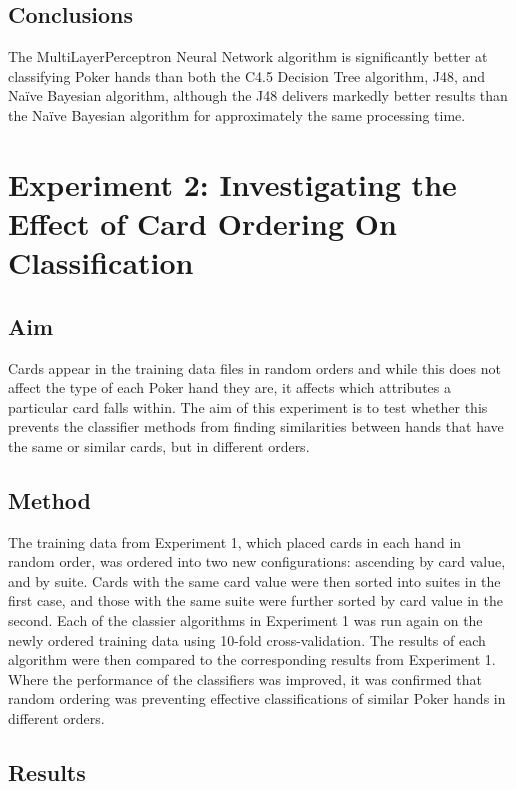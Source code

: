 \documentclass[10pt, a4paper]{article}
\begin{document}
\subsection*{Conclusions}

The MultiLayerPerceptron Neural Network algorithm is significantly better at classifying Poker hands than both the C4.5 Decision Tree algorithm, J48, and Na\"ive Bayesian algorithm, although the J48 delivers markedly better results than the Na\"ive Bayesian algorithm for approximately the same processing time.


\section*{Experiment 2: Investigating the Effect of Card Ordering On Classification}

\subsection*{Aim}

Cards appear in the training data files in random orders and while this does not affect the type of each Poker hand they are, it affects which attributes a particular card falls within. The aim of this experiment is to test whether this prevents the classifier methods from finding similarities between hands that have the same or similar cards, but in different orders.

\subsection*{Method}

The training data from Experiment 1, which placed cards in each hand in random order, was ordered into two new configurations: ascending by card value, and by suite. Cards with the same card value were then sorted into suites in the first case, and those with the same suite were further sorted by card value in the second. Each of the classier algorithms in Experiment 1 was run again on the newly ordered training data using 10-fold cross-validation. The results of each algorithm were then compared to the corresponding results from Experiment 1. Where the performance of the classifiers was improved, it was confirmed that random ordering was preventing effective classifications of similar Poker hands in different orders.

\subsection*{Results}
\end{document}
